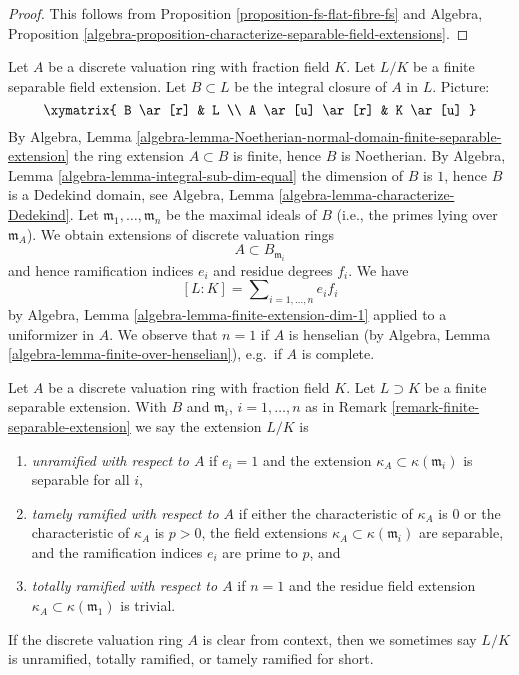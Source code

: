 \begin{proof}
This follows from Proposition \ref{proposition-fs-flat-fibre-fs} and
Algebra, Proposition
\ref{algebra-proposition-characterize-separable-field-extensions}.
\end{proof}

\begin{remark}
\label{remark-finite-separable-extension}
Let $A$ be a discrete valuation ring with fraction field $K$.
Let $L/K$ be a finite separable field extension.
Let $B \subset L$ be the integral closure of $A$ in $L$.
Picture:
$$
\xymatrix{
B \ar[r] & L \\
A \ar[u] \ar[r] & K \ar[u]
}
$$
By Algebra, Lemma
\ref{algebra-lemma-Noetherian-normal-domain-finite-separable-extension}
the ring extension $A \subset B$ is finite, hence $B$ is Noetherian.
By Algebra, Lemma \ref{algebra-lemma-integral-sub-dim-equal}
the dimension of $B$ is $1$, hence $B$ is a Dedekind domain, see
Algebra, Lemma \ref{algebra-lemma-characterize-Dedekind}.
Let $\mathfrak m_1, \ldots, \mathfrak m_n$ be the maximal ideals
of $B$ (i.e., the primes lying over $\mathfrak m_A$). We obtain
extensions of discrete valuation rings
$$
A \subset B_{\mathfrak m_i}
$$
and hence ramification indices $e_i$ and residue degrees $f_i$. We have
$$
[L : K] = \sum\nolimits_{i = 1, \ldots, n} e_i f_i
$$
by Algebra, Lemma \ref{algebra-lemma-finite-extension-dim-1}
applied to a uniformizer in $A$.
We observe that $n = 1$ if $A$ is henselian (by
Algebra, Lemma \ref{algebra-lemma-finite-over-henselian}), e.g.\ if
$A$ is complete.
\end{remark}

\begin{definition}
\label{definition-types-of-extensions}
Let $A$ be a discrete valuation ring with fraction field $K$. Let $L \supset K$
be a finite separable extension. With $B$ and
$\mathfrak m_i$, $i = 1, \ldots, n$
as in Remark \ref{remark-finite-separable-extension} we say the extension
$L/K$ is
\begin{enumerate}
\item {\it unramified with respect to $A$} if $e_i = 1$ and the extension
$\kappa_A \subset \kappa(\mathfrak m_i)$ is separable for all $i$,
\item {\it tamely ramified with respect to $A$}
if either the characteristic of $\kappa_A$
is $0$ or the characteristic of $\kappa_A$ is $p > 0$, the field extensions
$\kappa_A \subset \kappa(\mathfrak m_i)$ are separable,
and the ramification indices $e_i$ are prime to $p$, and
\item {\it totally ramified with respect to $A$}
if $n = 1$ and the residue field extension
$\kappa_A \subset \kappa(\mathfrak m_1)$ is trivial.
\end{enumerate}
If the discrete valuation ring $A$ is clear from context, then we sometimes
say $L/K$ is unramified, totally ramified, or tamely ramified for short.
\end{definition}

